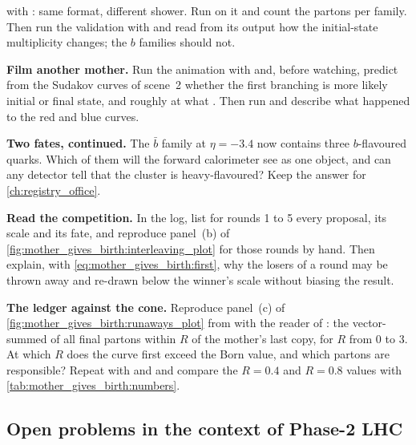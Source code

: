 \begin{exercises}
   with :
  same format, different shower. Run  on it and
  count the partons per family. Then run the validation with
   and read from its output how the initial-state
  multiplicity changes; the $b$ families should not.
\item \textbf{Film another mother.} Run the animation with
   and, before watching, predict from the
  Sudakov curves of scene~2 whether the first branching is more likely
  initial or final state, and roughly at what \pt. Then run
   and describe what happened to the red
  and blue curves.
\item \textbf{Two fates, continued.} The $\bar b$ family at $\eta=-3.4$
  now contains three $b$-flavoured quarks. Which of them will the forward
  calorimeter see as one object, and can any detector tell that the
  cluster is heavy-flavoured? Keep the answer for \cref{ch:registry_office}.
\item \textbf{Read the competition.} In the  log, list for rounds
  1 to 5 every proposal, its scale and its fate, and reproduce panel~(b) of
  \cref{fig:mother_gives_birth:interleaving_plot} for those rounds by hand.
  Then explain, with \cref{eq:mother_gives_birth:first}, why the losers of
  a round may be thrown away and re-drawn below the winner's scale without
  biasing the result.
\item \textbf{The ledger against the cone.} Reproduce panel~(c) of
  \cref{fig:mother_gives_birth:runaways_plot} from  with
  the reader of : the vector-summed \pt of all
  final partons within $R$ of the mother's last copy, for $R$ from $0$ to
  $3$. At which $R$ does the curve first exceed the Born value, and which
  partons are responsible? Repeat with  and  and
  compare the $R=0.4$ and $R=0.8$ values with \cref{tab:mother_gives_birth:numbers}.
\end{exercises}

\subsection*{Open problems in the context of Phase-2 LHC}
\label{sec:mother_gives_birth:open_problems}

